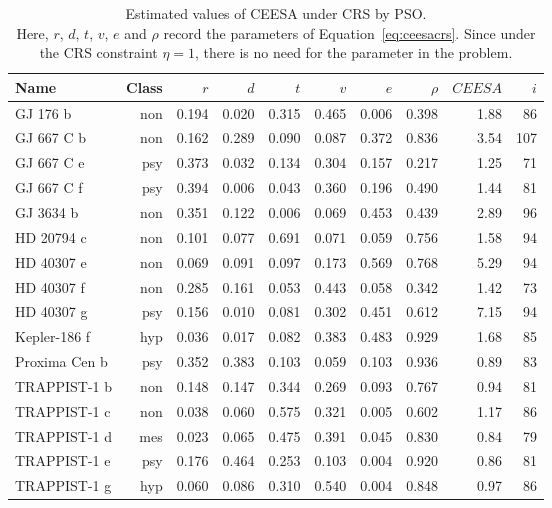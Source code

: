 \documentclass[10pt]{article}
\begin{document}
\begin{table}
  \centering
  \begin{tabular}{l r r r r r r r r r}
    \toprule
    Name & Class & $r$ & $d$ & $t$ & $v$ & $e$ & $\rho$ & $\mathit{CEESA}$ & $i$\\
    \midrule
    GJ 176 b & non & 0.194 & 0.020 & 0.315 & 0.465 & 0.006 & 0.398 & 1.88 &  86\\
    GJ 667 C b & non & 0.162 & 0.289 & 0.090 & 0.087 & 0.372 & 0.836 & 3.54 & 107\\
    GJ 667 C e & psy & 0.373 & 0.032 & 0.134 & 0.304 & 0.157 & 0.217 & 1.25 &  71\\
    GJ 667 C f & psy & 0.394 & 0.006 & 0.043 & 0.360 & 0.196 & 0.490 & 1.44 &  81\\
    GJ 3634 b & non & 0.351 & 0.122 & 0.006 & 0.069 & 0.453 & 0.439 & 2.89 &  96\\
    HD 20794 c & non & 0.101 & 0.077 & 0.691 & 0.071 & 0.059 & 0.756 & 1.58 &  94\\
    HD 40307 e & non & 0.069 & 0.091 & 0.097 & 0.173 & 0.569 & 0.768 & 5.29 &  94\\
    HD 40307 f & non & 0.285 & 0.161 & 0.053 & 0.443 & 0.058 & 0.342 & 1.42 &  73\\
    HD 40307 g & psy & 0.156 & 0.010 & 0.081 & 0.302 & 0.451 & 0.612 & 7.15 &  94\\
    Kepler-186 f & hyp & 0.036 & 0.017 & 0.082 & 0.383 & 0.483 & 0.929 & 1.68 &  85\\
    Proxima Cen b & psy & 0.352 & 0.383 & 0.103 & 0.059 & 0.103 & 0.936 & 0.89 &  83\\
    TRAPPIST-1 b & non & 0.148 & 0.147 & 0.344 & 0.269 & 0.093 & 0.767 & 0.94 &  81\\
    TRAPPIST-1 c & non & 0.038 & 0.060 & 0.575 & 0.321 & 0.005 & 0.602 & 1.17 &  86\\
    TRAPPIST-1 d & mes & 0.023 & 0.065 & 0.475 & 0.391 & 0.045 & 0.830 & 0.84 &  79\\
    TRAPPIST-1 e & psy & 0.176 & 0.464 & 0.253 & 0.103 & 0.004 & 0.920 & 0.86 &  81\\
    TRAPPIST-1 g & hyp & 0.060 & 0.086 & 0.310 & 0.540 & 0.004 & 0.848 & 0.97 &  86\\
    \bottomrule
  \end{tabular}
  \caption{Estimated values of CEESA under CRS by PSO.\\
    \footnotesize Here, $r$, $d$, $t$, $v$, $e$ and $\rho$ record the parameters of Equation~\ref{eq:ceesacrs}. Since
    under the CRS constraint $\eta=1$, there is no need for the parameter in the problem.
  }\label{tab:ceesacrs}
\end{table}
\end{document}
